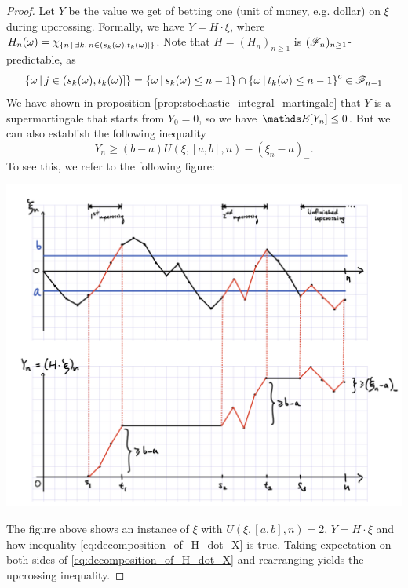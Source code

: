 \begin{proof}
Let $Y$ be the value we get of betting one (unit of money, e.g. dollar) on $\xi$ during upcrossing. Formally, we have $Y = H \cdot \xi$, where $H_n(\omega) = \chi_{\left\{ n \,|\, \exists k, \, n \in (s_k(\omega), t_k(\omega)] \right \}}$. Note that $H = (H_n)_{n\geq 1}$ is $(\mathcal{F}_n)_{n\geq 1}$-predictable, as 
\begin{equation}
    \left\{ \omega \,|\, j \in (s_k(\omega), t_k(\omega)] \right \} = \left\{ \omega \,|\, s_k(\omega) \leq n-1 \right \} \cap \left\{ \omega \,|\, t_k(\omega) \leq n-1 \right \}^c \in \mathcal{F}_{n-1}
\end{equation}
We have shown in proposition \ref{prop:stochastic_integral_martingale} that $Y$ is a supermartingale that starts from $Y_0=0$, so we have $\E[Y_n]\leq 0$. But we can also establish the following inequality
\begin{equation} \label{eq:decomposition_of_H_dot_X}
    Y_n \geq (b-a) U(\xi,[a,b],n) - (\xi_n - a)_{-}. 
\end{equation}
To see this, we refer to the following figure: \\
\begin{center}
\includegraphics[width=\textwidth]{figures/upcrossing.png}
\end{center}

The figure above shows an instance of $\xi$ with $U(\xi,[a,b],n)=2$, $Y = H\cdot \xi$ and how inequality \eqref{eq:decomposition_of_H_dot_X} is true. Taking expectation on both sides of \eqref{eq:decomposition_of_H_dot_X} and rearranging yields the upcrossing inequality.
\end{proof}

